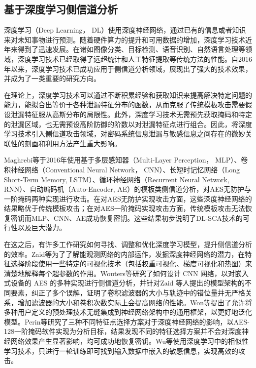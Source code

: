 {	\subsection{基于深度学习侧信道分析}
	
	深度学习（Deep Learning， DL）使用深度神经网络，通过已有的信息或者知识来对未知事物进行预测。随着硬件算力的提升和可用数据的增加，深度学习技术近年来得到了迅速发展。在诸如图像分类\citep{Szegedy17}、目标检测\citep{Girshick15}、语音识别\citep{Hinton12}、自然语言处理\citep{Radford18}等领域，深度学习技术已经取得了远超统计和人工特征提取等传统方法的性能。自2016年以来，深度学习技术已成功应用于侧信道分析领域，展现出了强大的技术效果，并成为了一类重要的研究方向。%
	
	在理论上，深度学习技术可以通过不断积累经验和获取知识来提高解决特定问题的能力，能拟合出等价于各种泄漏特征分布的函数，从而克服了传统模板攻击需要假设泄漏特征服从高斯分布的局限性。此外，深度学习技术无需预先获取掩码和特定的泄漏区域，也无需预设高阶防御的阶数以对泄漏特征点进行组合。因此，将深度学习技术引入侧信道攻击领域，对密码系统信息泄漏与敏感信息之间存在的微妙关联性的刻画和利用方法产生重大影响。
	
	Maghrebi等\citep{Maghrebi16}于2016年使用基于多层感知器（Multi-Layer Perception， MLP）、卷积神经网络（Conventional Neural Network， CNN）、长短时记忆网络（Long Short-Term Memory, LSTM）、循环神经网络（Recurrent Neural Network, RNN）、自动编码机（Auto-Encoder, AE）的模板类侧信道分析，对AES无防护与一阶掩码两种实现进行攻击。在对AES无防护实现攻击方面，这些深度神经网络的结果略优于传统模板攻击；在对AES一阶掩码实现攻击方面，传统模板攻击无法恢复密钥而MLP、CNN、AE成功恢复密钥。这些结果初步说明了DL-SCA技术的可行性以及巨大潜力。
	
	在这之后，有许多工作研究如何寻找、调整和优化深度学习模型，提升侧信道分析的效率。Zaid等\citep{Zaid20}为了了解能观测网络的内部运作，发掘深度神经网络的潜力，在特征选择阶段使用一些特定的可视化技术（包括权重可视化、梯度可视化和热图）来清楚地解释每个超参数的作用。Wouters等\citep{Wouters20}研究了如何设计 CNN 网络，以对嵌入式设备的 AES 的多种实现进行侧信道分析，并针对Zaid 等人提出的模型架构的不同要素，纠正了多个误解，证明了卷积滤波器的大小与轨迹中的错位量并无严格关系，增加滤波器的大小和卷积次数实际上会提高网络的性能。Won等\citep{Won21}提出了允许将多种用户定义的预处理技术无缝集成到神经网络架构中的通用框架，以更好地泛化模型。Perin等\citep{Perin22}研究了三种不同特征点选择方案对于深度神经网络的影响，以AES-128一阶掩码软件实现为分析目标，结果发现不同的特征选择方案并不会对深度神经网络效果产生显著影响，均可成功地恢复密钥。Wu等\citep{Wu22}使用深度学习中的相似性学习技术，只进行一轮训练即可找到输入数据中嵌入的敏感信息，实现高效的攻击。
	
}
